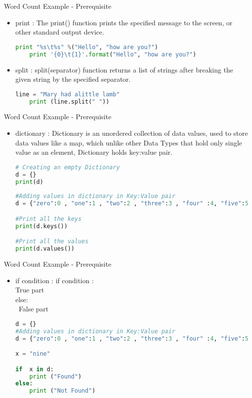 \documentclass[pdf]{beamer}
\begin{document}
\begin{frame}[fragile]{Word Count Example - Prerequisite}
\begin{itemize}
	\item print : The print() function prints the specified message to the screen, or other standard output device.
\begin{lstlisting}[language=python]
	print "%s\t%s" %("Hello", "how are you?")
	print '{0}\t{1}'.format("Hello", "how are you?")
\end{lstlisting}

	\item split : split(separator) function returns a list of strings after breaking the given string by the specified separator.

\begin{lstlisting}[language=python]
	line = "Mary had alittle lamb"
	print (line.split(" "))
\end{lstlisting}

\end{itemize}		
\end{frame}


\begin{frame}[fragile]{Word Count Example - Prerequisite}
\begin{itemize}
	\item dictionary : Dictionary is an unordered collection of data values, used to store data values like a map, which unlike other Data Types that hold only single value as an element, Dictionary holds key:value pair. 
\begin{lstlisting}[language=python]
# Creating an empty Dictionary 
d = {} 
print(d) 
  
#Adding values in dictionary in Key:Value pair
d = {"zero":0 , "one":1 , "two":2 , "three":3 , "four" :4, "five":5, "six":6, "seven":7, "eight":8, "nine":9 }

#Print all the keys
print(d.keys())

#Print all the values
print(d.values())
\end{lstlisting}
\end{itemize}		
\end{frame}

\begin{frame}[fragile]{Word Count Example - Prerequisite}
\begin{itemize}
	\item if condition :
		if condition :
\\			True part
\\		else:
\\\			False part
		  
\begin{lstlisting}[language=python]
d = {} 
#Adding values in dictionary in Key:Value pair
d = {"zero":0 , "one":1 , "two":2 , "three":3 , "four" :4, "five":5, "six":6, "seven":7, "eight":8, "nine":9 }

x = "nine"

if  x in d:
	print ("Found")
else:
	print ("Not Found")

\end{lstlisting}
\end{itemize}		
\end{frame}
\end{document}
